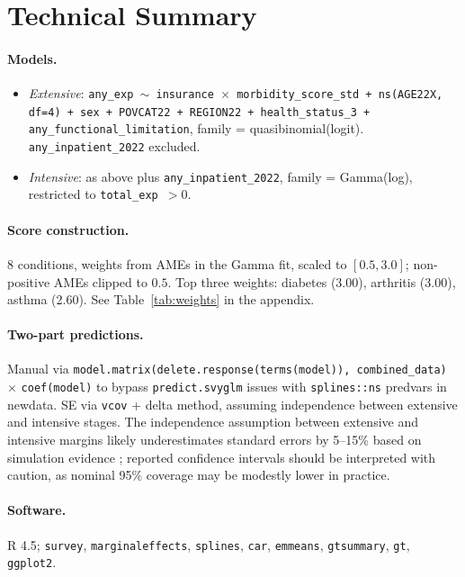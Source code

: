 \documentclass[11pt,a4paper]{article}
\begin{document}
\section{Technical Summary}

\paragraph{Models.}
\begin{itemize}
\item \emph{Extensive}: \texttt{any\_exp $\sim$ insurance $\times$ morbidity\_score\_std + ns(AGE22X, df=4) + sex + POVCAT22 + REGION22 + health\_status\_3 + any\_functional\_limitation}, family = quasibinomial(logit). \texttt{any\_inpatient\_2022} excluded.
\item \emph{Intensive}: as above plus \texttt{any\_inpatient\_2022}, family = Gamma(log), restricted to \texttt{total\_exp $> 0$}.
\end{itemize}

\paragraph{Score construction.} 8 conditions, weights from AMEs in the Gamma fit, scaled to $[0.5, 3.0]$; non-positive AMEs clipped to $0.5$. Top three weights: diabetes (3.00), arthritis (3.00), asthma (2.60). See Table~\ref{tab:weights} in the appendix.

\paragraph{Two-part predictions.} Manual via \texttt{model.matrix(delete.response(terms(model)), combined\_data)} $\times$ \texttt{coef(model)} to bypass \texttt{predict.svyglm} issues with \texttt{splines::ns} predvars in newdata. SE via \texttt{vcov} + delta method, assuming independence between extensive and intensive stages. The independence assumption between extensive and intensive margins likely underestimates standard errors by 5--15\% based on simulation evidence \citep{mullahy1998}; reported confidence intervals should be interpreted with caution, as nominal 95\% coverage may be modestly lower in practice.

\paragraph{Software.} R 4.5; \texttt{survey}, \texttt{marginaleffects}, \texttt{splines}, \texttt{car}, \texttt{emmeans}, \texttt{gtsummary}, \texttt{gt}, \texttt{ggplot2}.
\end{document}
